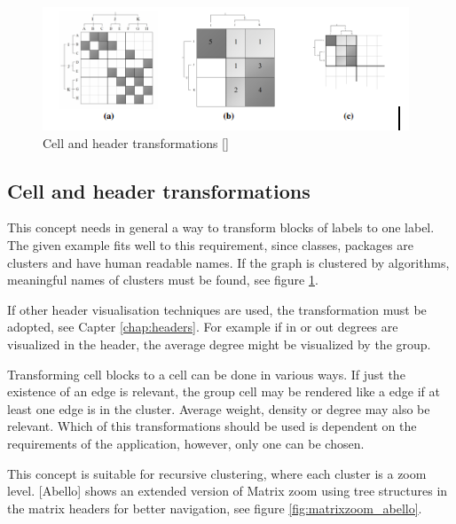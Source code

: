 \begin{figure}[h]
\centering
\includegraphics{images/matrixzoom_transform}
\caption{Cell and header transformations [\cite{ham}] \label{fig:matrixzoom_transform}}
\end{figure}




\subsection{Cell and header transformations}   
This concept needs in general a way to transform blocks of labels to one label. The given example fits well to this requirement, since classes, packages are clusters and have human readable names. If the graph is clustered by algorithms, meaningful names of clusters must be found, see figure \ref{fig:matrixzoom_transform}.

If other header visualisation techniques are used, the transformation must be adopted, see Capter \ref{chap:headers}. For example if in or out degrees are visualized in the header, the average degree might be visualized by the group.

Transforming cell blocks to a cell can be done in various ways. If just the existence of an edge is relevant, the group cell may be rendered like a edge if at least one edge is in the cluster. Average weight, density or degree may also be relevant. Which of this transformations should be used is dependent on the requirements of the application, however, only one can be chosen.

This concept is suitable for recursive clustering, where each cluster is a zoom level. [Abello] shows an extended version of Matrix zoom using tree structures in the matrix headers for better navigation, see figure \ref{fig:matrixzoom_abello}.

